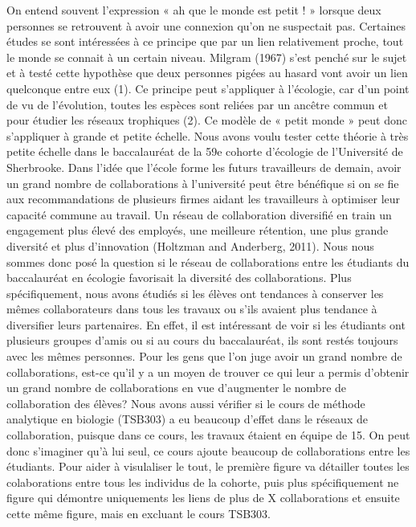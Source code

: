 \documentclass[9pt,twocolumn,twoside,]{pnas-new}
\begin{document}
On entend souvent l'expression « ah que le monde est petit ! » lorsque
deux personnes se retrouvent à avoir une connexion qu'on ne suspectait
pas. Certaines études se sont intéressées à ce principe que par un lien
relativement proche, tout le monde se connait à un certain niveau.
Milgram (1967) s'est penché sur le sujet et à testé cette hypothèse que
deux personnes pigées au hasard vont avoir un lien quelconque entre eux
(1). Ce principe peut s'appliquer à l'écologie, car d'un point de vu de
l'évolution, toutes les espèces sont reliées par un ancêtre commun et
pour étudier les réseaux trophiques (2). Ce modèle de « petit monde »
peut donc s'appliquer à grande et petite échelle. Nous avons voulu
tester cette théorie à très petite échelle dans le baccalauréat de la
59e cohorte d'écologie de l'Université de Sherbrooke. Dans l'idée que
l'école forme les futurs travailleurs de demain, avoir un grand nombre
de collaborations à l'université peut être bénéfique si on se fie aux
recommandations de plusieurs firmes aidant les travailleurs à optimiser
leur capacité commune au travail. Un réseau de collaboration diversifié
en train un engagement plus élevé des employés, une meilleure rétention,
une plus grande diversité et plus d'innovation (Holtzman and Anderberg,
2011). Nous nous sommes donc posé la question si le réseau de
collaborations entre les étudiants du baccalauréat en écologie
favorisait la diversité des collaborations. Plus spécifiquement, nous
avons étudiés si les élèves ont tendances à conserver les mêmes
collaborateurs dans tous les travaux ou s'ils avaient plus tendance à
diversifier leurs partenaires. En effet, il est intéressant de voir si
les étudiants ont plusieurs groupes d'amis ou si au cours du
baccalauréat, ils sont restés toujours avec les mêmes personnes. Pour
les gens que l'on juge avoir un grand nombre de collaborations, est-ce
qu'il y a un moyen de trouver ce qui leur a permis d'obtenir un grand
nombre de collaborations en vue d'augmenter le nombre de collaboration
des élèves? Nous avons aussi vérifier si le cours de méthode analytique
en biologie (TSB303) a eu beaucoup d'effet dans le réseaux de
collaboration, puisque dans ce cours, les travaux étaient en équipe de
15. On peut donc s'imaginer qu'à lui seul, ce cours ajoute beaucoup de
collaborations entre les étudiants. Pour aider à visulaliser le tout, le
première figure va détailler toutes les colaborations entre tous les
individus de la cohorte, puis plus spécifiquement ne figure qui démontre
uniquements les liens de plus de X collaborations et ensuite cette même
figure, mais en excluant le cours TSB303.
\end{document}
